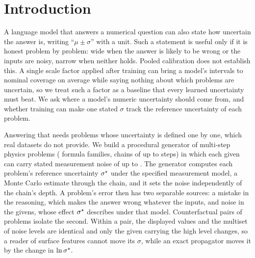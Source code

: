 \section{Introduction}
\label{sec:intro}

A language model that answers a numerical question can also state how uncertain the answer is, writing
``$\mu \pm \sigma$'' with a unit.
Such a statement is useful only if it is honest problem by problem: wide when the answer is likely to be wrong or the
inputs are noisy, narrow when neither holds.
Pooled calibration does not establish this.
A single scale factor applied after training can bring a model's intervals to nominal coverage on average while
saying nothing about which problems are uncertain, so we treat such a factor as a baseline that every learned
uncertainty must beat.
We ask where a model's numeric uncertainty should come from, and whether training can make one stated $\sigma$ track
the reference uncertainty of each problem.

Answering that needs problems whose uncertainty is defined one by one, which real datasets do not provide.
We build a procedural generator of multi-step physics problems ( formula families, chains of up to
 steps) in which each given can carry stated measurement noise of up to .
The generator computes each problem's reference uncertainty $\sigma^{\star}$ under the specified measurement model, a Monte
Carlo estimate through the chain, and it sets the noise independently of the chain's depth.
A problem's error then has two separable sources: a mistake in the reasoning, which makes the answer wrong whatever
the inputs, and noise in the givens, whose effect $\sigma^{\star}$ describes under that model.
Counterfactual pairs of problems isolate the second.
Within a pair, the displayed values and the multiset of noise levels are identical and only the given carrying the
high level changes, so a reader of surface features cannot move its $\sigma$, while an exact propagator moves it by the
change in $\ln\sigma^{\star}$.

